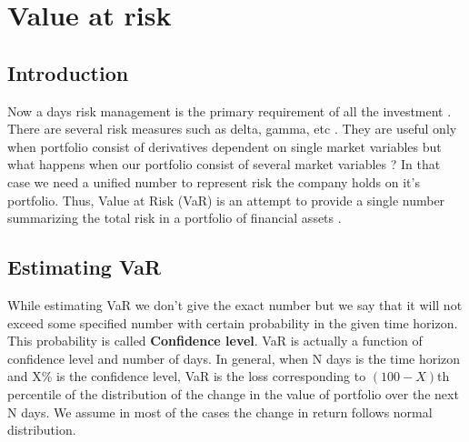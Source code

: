 \documentclass[11pt]{article}
\numberwithin{equation}{section}
\begin{document}


\pagebreak

\renewcommand\contentsname{{\Huge Contents}\vspace{0.5cm}}
\cleardoublepage
{}
{}
\setcounter{tocdepth}{8}

\tableofcontents

\cleardoublepage
{}
\renewcommand\listfigurename{{\Huge List of Figures}\vspace{0.5cm}}

\pagebreak

\section{Value at risk}
\medskip
\subsection{Introduction}
\medskip
Now a days risk management is the primary requirement of all the investment . There are several risk measures such as delta, gamma, etc . They are useful only when portfolio consist of derivatives dependent on single market variables but what happens when our portfolio consist of several market variables ? In that case we need a unified number to represent risk the company holds on it's portfolio. Thus, Value at Risk (VaR) is an attempt to provide a single number summarizing the total risk in a portfolio of financial assets .  
\medskip
\subsection{Estimating VaR}
\medskip
While estimating VaR we don't give the exact number but we say that it will not exceed some specified number with certain probability in the given time horizon. This probability is called \textbf{Confidence level}. VaR is actually a function of confidence level and number of days. In general, when N days is the time horizon and X\% is the confidence level, VaR is the loss corresponding to $ (100-X) $th percentile of the distribution of the change in the value of portfolio over the next N days. We assume in most of the cases the change in return follows normal distribution. \medskip
\end{document}
